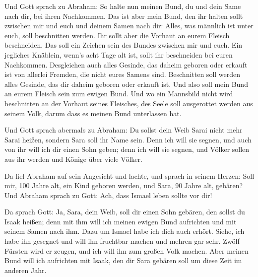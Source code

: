  Und Gott sprach zu Abraham: So halte nun meinen Bund, du
und dein Same nach dir, bei ihren Nachkommen.  Das ist aber
mein Bund, den ihr halten sollt zwischen mir und euch und deinem Samen
nach dir: Alles, was männlich ist unter euch, soll beschnitten werden.
 Ihr sollt aber die Vorhaut an eurem Fleisch beschneiden.
Das soll ein Zeichen sein des Bundes zwischen mir und euch.
 Ein jegliches Knäblein, wenn's acht Tage alt ist, sollt
ihr beschneiden bei euren Nachkommen. Desgleichen auch alles Gesinde,
das daheim geboren oder erkauft ist von allerlei Fremden, die nicht
eures Samens sind.  Beschnitten soll werden alles Gesinde,
das dir daheim geboren oder erkauft ist. Und also soll mein Bund an
eurem Fleisch sein zum ewigen Bund.  Und wo ein Mannsbild
nicht wird beschnitten an der Vorhaut seines Fleisches, des Seele soll
ausgerottet werden aus seinem Volk, darum dass es meinen Bund
unterlassen hat.

 Und Gott sprach abermals zu Abraham: Du sollst dein Weib
Sarai nicht mehr Sarai heißen, sondern Sara soll ihr Name sein.
 Denn ich will sie segnen, und auch von ihr will ich dir
einen Sohn geben; denn ich will sie segnen, und Völker sollen aus ihr
werden und Könige über viele Völker.

 Da fiel Abraham auf sein Angesicht und lachte, und sprach
in seinem Herzen: Soll mir, 100 Jahre alt, ein Kind geboren werden, und
Sara, 90 Jahre alt, gebären?  Und Abraham sprach zu Gott:
Ach, dass Ismael leben sollte vor dir!

 Da sprach Gott: Ja, Sara, dein Weib, soll dir einen Sohn
gebären, den sollst du Isaak heißen; denn mit ihm will ich meinen ewigen
Bund aufrichten und mit seinem Samen nach ihm.  Dazu um
Ismael habe ich dich auch erhört. Siehe, ich habe ihn gesegnet und will
ihn fruchtbar machen und mehren gar sehr. Zwölf Fürsten wird er zeugen,
und ich will ihn zum großen Volk machen.  Aber meinen Bund
will ich aufrichten mit Isaak, den dir Sara gebären soll um diese Zeit
im anderen Jahr.

